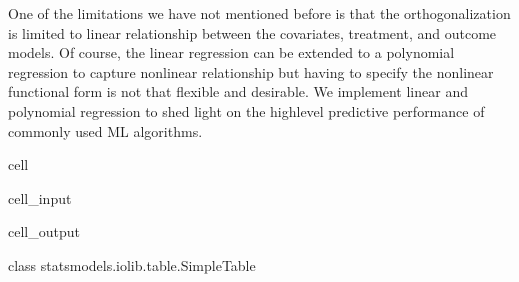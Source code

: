 \documentclass[letterpaper,10pt,english]{jupyterBook}
\begin{document}
\sphinxAtStartPar
One of the limitations we have not mentioned before is that the orthogonalization is limited to linear relationship between the covariates, treatment, and outcome models. Of course, the linear regression can be extended to a polynomial regression to capture nonlinear relationship but having to specify the nonlinear functional form is not that flexible and desirable. We implement linear and polynomial regression to shed light on the high\sphinxhyphen{}level predictive performance of commonly used ML algorithms.

\begin{sphinxuseclass}{cell}\begin{sphinxVerbatimInput}

\begin{sphinxuseclass}{cell_input}
\begin{sphinxVerbatim}[commandchars=\\\{\}]
   
         
                           
\PYG{p}{[}\PYG{p}{]}
\end{sphinxVerbatim}

\end{sphinxuseclass}\end{sphinxVerbatimInput}
\begin{sphinxVerbatimOutput}

\begin{sphinxuseclass}{cell_output}
\begin{sphinxVerbatim}[commandchars=\\\{\}]
\PYGZlt{}class \PYGZsq{}statsmodels.iolib.table.SimpleTable\PYGZsq{}\PYGZgt{}
\end{sphinxVerbatim}

\end{sphinxuseclass}\end{sphinxVerbatimOutput}

\end{sphinxuseclass}
\end{document}
